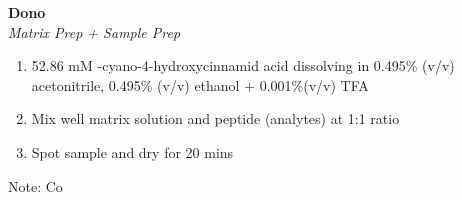 \textbf{Dono} 
\\
\textit{Matrix Prep + Sample Prep}
\begin{enumerate}
\item{52.86 mM \alpha-cyano-4-hydroxycinnamid acid dissolving in 0.495\% (v/v) acetonitrile, 0.495\% (v/v) ethanol + 0.001\%(v/v) TFA}
\item{Mix well matrix solution and peptide (analytes) at 1:1 ratio}
\item{Spot sample and dry for 20 mins}
\end{enumerate}
\footnotesize
Note: Co